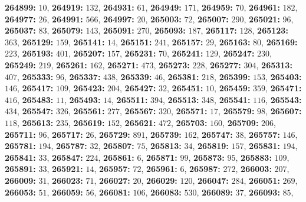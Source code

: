 \textsf{\bfseries 264899:} $10$, \textsf{\bfseries 264919:} $132$, \textsf{\bfseries 264931:} $61$, \textsf{\bfseries 264949:} $171$, \textsf{\bfseries 264959:} $70$, \textsf{\bfseries 264961:} $182$, \textsf{\bfseries 264977:} $26$, \textsf{\bfseries 264991:} $566$, \textsf{\bfseries 264997:} $20$, \textsf{\bfseries 265003:} $72$, \textsf{\bfseries 265007:} $290$, \textsf{\bfseries 265021:} $96$, \textsf{\bfseries 265037:} $83$, \textsf{\bfseries 265079:} $143$, \textsf{\bfseries 265091:} $270$, \textsf{\bfseries 265093:} $187$, \textsf{\bfseries 265117:} $128$, \textsf{\bfseries 265123:} $363$, \textsf{\bfseries 265129:} $159$, \textsf{\bfseries 265141:} $14$, \textsf{\bfseries 265151:} $241$, \textsf{\bfseries 265157:} $29$, \textsf{\bfseries 265163:} $80$, \textsf{\bfseries 265169:} $223$, \textsf{\bfseries 265193:} $401$, \textsf{\bfseries 265207:} $157$, \textsf{\bfseries 265231:} $70$, \textsf{\bfseries 265241:} $129$, \textsf{\bfseries 265247:} $230$, \textsf{\bfseries 265249:} $219$, \textsf{\bfseries 265261:} $162$, \textsf{\bfseries 265271:} $473$, \textsf{\bfseries 265273:} $228$, \textsf{\bfseries 265277:} $304$, \textsf{\bfseries 265313:} $407$, \textsf{\bfseries 265333:} $96$, \textsf{\bfseries 265337:} $438$, \textsf{\bfseries 265339:} $46$, \textsf{\bfseries 265381:} $218$, \textsf{\bfseries 265399:} $153$, \textsf{\bfseries 265403:} $146$, \textsf{\bfseries 265417:} $109$, \textsf{\bfseries 265423:} $204$, \textsf{\bfseries 265427:} $32$, \textsf{\bfseries 265451:} $10$, \textsf{\bfseries 265459:} $359$, \textsf{\bfseries 265471:} $416$, \textsf{\bfseries 265483:} $11$, \textsf{\bfseries 265493:} $14$, \textsf{\bfseries 265511:} $394$, \textsf{\bfseries 265513:} $348$, \textsf{\bfseries 265541:} $116$, \textsf{\bfseries 265543:} $434$, \textsf{\bfseries 265547:} $326$, \textsf{\bfseries 265561:} $277$, \textsf{\bfseries 265567:} $320$, \textsf{\bfseries 265571:} $17$, \textsf{\bfseries 265579:} $98$, \textsf{\bfseries 265607:} $118$, \textsf{\bfseries 265613:} $235$, \textsf{\bfseries 265619:} $152$, \textsf{\bfseries 265621:} $472$, \textsf{\bfseries 265703:} $160$, \textsf{\bfseries 265709:} $206$, \textsf{\bfseries 265711:} $96$, \textsf{\bfseries 265717:} $26$, \textsf{\bfseries 265729:} $891$, \textsf{\bfseries 265739:} $162$, \textsf{\bfseries 265747:} $38$, \textsf{\bfseries 265757:} $146$, \textsf{\bfseries 265781:} $194$, \textsf{\bfseries 265787:} $32$, \textsf{\bfseries 265807:} $75$, \textsf{\bfseries 265813:} $34$, \textsf{\bfseries 265819:} $157$, \textsf{\bfseries 265831:} $194$, \textsf{\bfseries 265841:} $33$, \textsf{\bfseries 265847:} $224$, \textsf{\bfseries 265861:} $6$, \textsf{\bfseries 265871:} $99$, \textsf{\bfseries 265873:} $95$, \textsf{\bfseries 265883:} $109$, \textsf{\bfseries 265891:} $33$, \textsf{\bfseries 265921:} $14$, \textsf{\bfseries 265957:} $72$, \textsf{\bfseries 265961:} $6$, \textsf{\bfseries 265987:} $272$, \textsf{\bfseries 266003:} $207$, \textsf{\bfseries 266009:} $31$, \textsf{\bfseries 266023:} $71$, \textsf{\bfseries 266027:} $20$, \textsf{\bfseries 266029:} $120$, \textsf{\bfseries 266047:} $284$, \textsf{\bfseries 266051:} $269$, \textsf{\bfseries 266053:} $51$, \textsf{\bfseries 266059:} $56$, \textsf{\bfseries 266081:} $106$, \textsf{\bfseries 266083:} $530$, \textsf{\bfseries 266089:} $37$, \textsf{\bfseries 266093:} $85$, 
